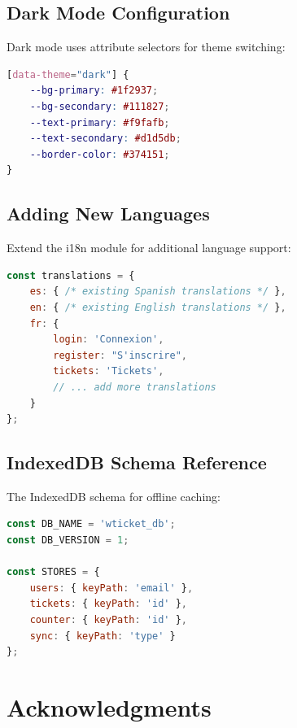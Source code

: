 \documentclass[12pt,a4paper]{report}
\begin{document}
\section{Dark Mode Configuration}
\label{app:dark-mode}

Dark mode uses attribute selectors for theme switching:

\begin{lstlisting}[language=CSS, caption={Dark Mode Configuration}, label={lst:dark-mode}]
[data-theme="dark"] {
    --bg-primary: #1f2937;
    --bg-secondary: #111827;
    --text-primary: #f9fafb;
    --text-secondary: #d1d5db;
    --border-color: #374151;
}
\end{lstlisting}

\section{Adding New Languages}
\label{app:i18n}

Extend the i18n module for additional language support:

\begin{lstlisting}[language=JavaScript, caption={Internationalization Extension}, label={lst:i18n-ext}]
const translations = {
    es: { /* existing Spanish translations */ },
    en: { /* existing English translations */ },
    fr: {
        login: 'Connexion',
        register: "S'inscrire",
        tickets: 'Tickets',
        // ... add more translations
    }
};
\end{lstlisting}

\section{IndexedDB Schema Reference}
\label{app:indexeddb}

The IndexedDB schema for offline caching:

\begin{lstlisting}[language=JavaScript, caption={IndexedDB Schema}, label={lst:indexeddb}]
const DB_NAME = 'wticket_db';
const DB_VERSION = 1;

const STORES = {
    users: { keyPath: 'email' },
    tickets: { keyPath: 'id' },
    counter: { keyPath: 'id' },
    sync: { keyPath: 'type' }
};
\end{lstlisting}

\cleardoublepage

\chapter*{Acknowledgments}
\thispagestyle{fancy}
\label{chap:acknowledgments}
\end{document}
